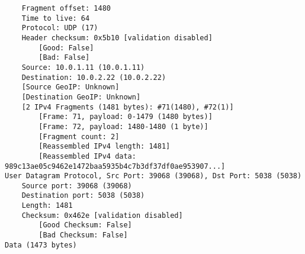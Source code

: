 \begin{lstlisting}
    Fragment offset: 1480
    Time to live: 64
    Protocol: UDP (17)
    Header checksum: 0x5b10 [validation disabled]
        [Good: False]
        [Bad: False]
    Source: 10.0.1.11 (10.0.1.11)
    Destination: 10.0.2.22 (10.0.2.22)
    [Source GeoIP: Unknown]
    [Destination GeoIP: Unknown]
    [2 IPv4 Fragments (1481 bytes): #71(1480), #72(1)]
        [Frame: 71, payload: 0-1479 (1480 bytes)]
        [Frame: 72, payload: 1480-1480 (1 byte)]
        [Fragment count: 2]
        [Reassembled IPv4 length: 1481]
        [Reassembled IPv4 data: 989c13ae05c9462e1472baa5935b4c7b3df37df0ae953907...]
User Datagram Protocol, Src Port: 39068 (39068), Dst Port: 5038 (5038)
    Source port: 39068 (39068)
    Destination port: 5038 (5038)
    Length: 1481
    Checksum: 0x462e [validation disabled]
        [Good Checksum: False]
        [Bad Checksum: False]
Data (1473 bytes)


\end{lstlisting}

